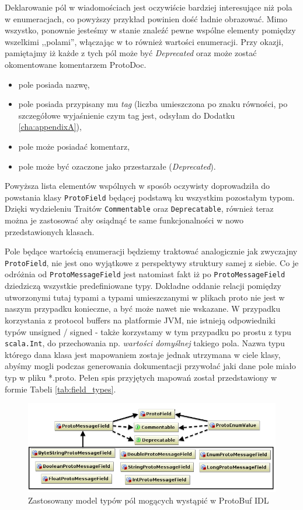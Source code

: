 \documentclass[pdflatex,11pt]{aghdpl}
\begin{document}
Deklarowanie pól w wiadomościach jest oczywiście bardziej interesujące niż pola w enumeracjach, co powyższy przykład powinien dość ładnie obrazować.
Mimo wszystko, ponownie jesteśmy w stanie znaleźć pewne wspólne elementy pomiędzy wszelkimi ,,polami'', włączając w to również wartości enumeracji.
Przy okazji, pamiętajmy iż każde  z tych pól może być \textit{Deprecated} oraz może zostać okomentowane komentarzem ProtoDoc.

\begin{itemize}
 \item pole posiada nazwę,
 \item pole posiada przypisany mu \textit{tag} (liczba umieszczona po znaku równości, po szczegółowe wyjaśnienie czym tag jest, odsyłam do Dodatku \ref{cha:appendixA}),
 \item pole może posiadać komentarz,
 \item pole może być ozaczone jako przestarzałe (\textit{Deprecated}).
\end{itemize}

Powyższa lista elementów wspólnych w sposób oczywisty doprowadziła do powstania klasy \verb|ProtoField| będącej podstawą ku wszystkim pozostałym typom.
Dzięki wydzieleniu Traitów \verb|Commentable| oraz \verb|Deprecatable|, również teraz można je zastosować aby osiądnąć te same funkcjonalności w nowo przedstawionych klasach.

Pole będące wartością enumeracji będziemy traktować analogicznie jak zwyczajny \verb|ProtoField|, nie jest ono wyjątkowe z perspektywy struktury samej z siebie.
Co je odróżnia od \verb|ProtoMessageField| jest natomiast fakt iż po \verb|ProtoMessageField| dziedziczą wszystkie predefiniowane typy.
Dokładne oddanie relacji pomiędzy utworzonymi tutaj typami a typami umieszczanymi w plikach proto nie jest w naszym przypadku konieczne, a być może nawet nie wskazane.
W przypadku korzystania z protocol buffers na platformie JVM, nie istnieją odpowiedniki typów unsigned / signed - także korzystamy w tym przypadku po prostu z 
typu \verb|scala.Int|, do przechowania np. \textit{wartości domyślnej} takiego pola. Nazwa typu którego dana klasa jest mapowaniem zostaje jednak utrzymana w ciele klasy,
abyśmy mogli podczas generowania dokumentacji przywołać jaki dane pole miało typ w pliku *.proto. Pełen spis przyjętych mapowań został przedstawiony w formie Tabeli \ref{tab:field_types}. 

\begin{figure}[ch]
\begin{center}
 \includegraphics[width=\textwidth]{fields_types}
\end{center}
\caption{Zastosowany model typów pól mogących wystąpić w ProtoBuf IDL}
\label{types_diagram}
\end{figure}
\end{document}
